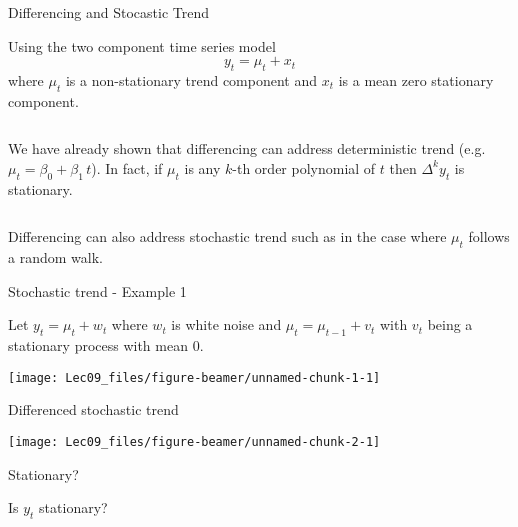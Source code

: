 \documentclass[11pt,ignorenonframetext,]{beamer}
\newenvironment{Shaded}{}{}
\newcommand{\KeywordTok}[1]{\textcolor[rgb]{0.00,0.44,0.13}{\textbf{#1}}}
\newcommand{\NormalTok}[1]{#1}
\newcommand{\OperatorTok}[1]{\textcolor[rgb]{0.40,0.40,0.40}{#1}}
\let\oldShaded\Shaded
\let\endoldShaded\endShaded
\renewenvironment{Shaded}{\footnotesize\begin{spacing}{0.9}\oldShaded}{\endoldShaded\end{spacing}}
\begin{document}
\begin{frame}[t]{Differencing and Stocastic Trend}
\protect\hypertarget{differencing-and-stocastic-trend}{}

Using the two component time series model \[ y_t = \mu_t + x_t \] where
\(\mu_t\) is a non-stationary trend component and \(x_t\) is a mean zero
stationary component.

\(~\)

We have already shown that differencing can address deterministic trend
(e.g. \(\mu_t = \beta_0+\beta_1 \, t\)). In fact, if \(\mu_t\) is any
\(k\)-th order polynomial of \(t\) then \(\Delta^k y_t\) is stationary.

\(~\)

Differencing can also address stochastic trend such as in the case where
\(\mu_t\) follows a random walk.

\end{frame}

\begin{frame}[t]{Stochastic trend - Example 1}
\protect\hypertarget{stochastic-trend---example-1}{}

Let \(y_t = \mu_t + w_t\) where \(w_t\) is white noise and
\(\mu_t = \mu_{t-1} + v_t\) with \(v_t\) being a stationary process with
mean 0.

\begin{center}\texttt{[image: Lec09\_files/figure-beamer/unnamed-chunk-1-1]} \end{center}

\end{frame}

\begin{frame}[fragile]{Differenced stochastic trend}
\protect\hypertarget{differenced-stochastic-trend}{}

\begin{Shaded}
\end{Shaded}

\begin{center}\texttt{[image: Lec09\_files/figure-beamer/unnamed-chunk-2-1]} \end{center}

\end{frame}

\begin{frame}[t]{Stationary?}
\protect\hypertarget{stationary}{}

Is \(y_t\) stationary?

\end{frame}
\end{document}
